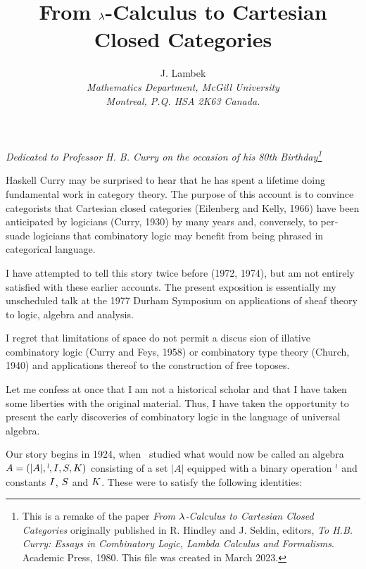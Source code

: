 \makeatletter
\newcommand*\dotop{\mathpalette\bigcdot@{.6}}
\newcommand*\bigcdot@[2]{\mathbin{\vcenter{\hbox{\scalebox{#2}{$\m@th#1\bullet$}}}}}
\makeatother

\title{\large From $\lambda$-Calculus to Cartesian Closed Categories}
\author{\normalsize J. Lambek \\
{\small\it Mathematics Department, McGill University} \\
{\small\it Montreal, P.Q. HSA 2K63 Canada.}}

\maketitle
{\centerline
{\small\it Dedicated to Professor H. B. Curry on the occasion of his 80th Birthday\footnote{
This is a remake of the paper {\it From $\lambda$-Calculus to Cartesian Closed Categories} originally published in R. Hindley and J. Seldin, 
editors, {\it To H.B. Curry: Essays in Combinatory Logic, Lambda Calculus and Formalisms}. 
Academic Press, 1980. This file was created in March 2023.}}}
\bigskip\bigskip

\noindent
Haskell Curry may be surprised to hear that he has spent a lifetime doing fundamental work in category theory. The purpose of this account is to convince categorists that Cartesian closed categories (Eilenberg and Kelly, 1966) have been anticipated by logicians (Curry, 1930) by many years and, conversely, to per­ suade logicians that combinatory logic may benefit from being phrased in categorical language.

I have attempted to tell this story twice before (1972, 1974), but am not entirely satisfied with these earlier accounts. The present exposition is essentially my unscheduled talk at the 1977 Durham Symposium on applications of sheaf theory to logic, algebra and analysis.

I regret that limitations of space do not permit a discus­ sion of illative combinatory logic (Curry and Feys, 1958) or combinatory type theory (Church, 1940) and applications thereof to the construction of free toposes.

Let me confess at once that I am not a historical scholar
and that I have taken some liberties with the original material. Thus, I have taken the opportunity to present the early discov­eries of combinatory logic in the language of universal algebra.

Our story begins in 1924, when \schon\ studied what would now be called an algebra $A = (|A|, \mathop{{}^\wr}\kern-.8pt, {I}, {S}, {K})$ consisting of
a set $|A|$ equipped with a binary operation $\mathop{{}^\wr}\kern-.8pt$
and constants ${I}$, ${S}$ and ${K}$. These were to satisfy the following identities:

